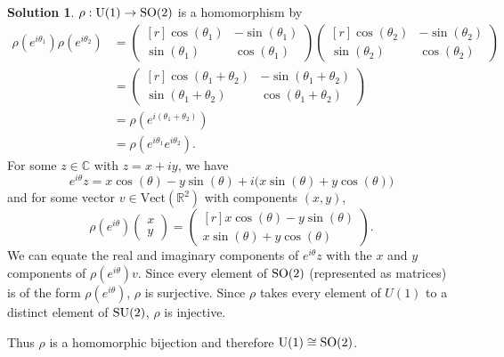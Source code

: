 \documentclass[11pt, a4paper]{report}
\theoremstyle{definition}
\newtheorem{sol}{Solution}[part]
\newcommand*{\SO}{\ensuremath\text{SO}}
\newcommand*{\U}{\ensuremath\text{U}}
\newcommand*{\SU}{\ensuremath\text{SU}}
\begin{document}
\begin{sol}

$\rho: \U(1) \to \SO(2)$ is a homomorphism by
\begin{align*}
    \rho(e^{i\theta_1}) \rho(e^{i\theta_2})
        &=
        \begin{pmatrix*}[r]
            \cos(\theta_1) & -\sin(\theta_1) \\
            \sin(\theta_1) & \cos(\theta_1)
        \end{pmatrix*}
        \begin{pmatrix*}[r]
            \cos(\theta_2) & -\sin(\theta_2) \\
            \sin(\theta_2) & \cos(\theta_2)
        \end{pmatrix*} \\
        &=
        \begin{pmatrix*}[r]
            \cos(\theta_1 + \theta_2) & -\sin(\theta_1 + \theta_2) \\
            \sin(\theta_1 + \theta_2) & \cos(\theta_1 + \theta_2)
        \end{pmatrix*} \\
        &= \rho(e^{i(\theta_1 + \theta_2)}) \\
        &= \rho(e^{i\theta_1}e^{i\theta_2}).
\end{align*}
For some $z \in \mathbb{C}$ with $z = x + iy$, we have
\[
    e^{i\theta} z = x \cos(\theta) - y \sin(\theta) + i \bigl( x \sin(\theta) + y \cos(\theta) \bigr)
\]
and for some vector $v \in \text{Vect}(\mathbb{R}^2)$ with components $(x, y)$,
\[
    \rho(e^{i\theta}) \begin{pmatrix} x \\ y \end{pmatrix}
        = \begin{pmatrix*}[r]
            x \cos(\theta) - y \sin(\theta) \\
            x \sin(\theta) + y \cos(\theta)
        \end{pmatrix*}.
\]
We can equate the real and imaginary components of $e^{i\theta} z$ with the $x$ and $y$ components of $\rho(e^{i\theta}) v$.
Since every element of $\SO(2)$ (represented as matrices) is of the form $\rho(e^{i\theta})$, $\rho$ is surjective.
Since $\rho$ takes every element of $U(1)$ to a distinct element of $\SU(2)$, $\rho$ is injective.

Thus $\rho$ is a homomorphic bijection and therefore $\U(1) \cong \SO(2)$.

\end{sol}
\end{document}
